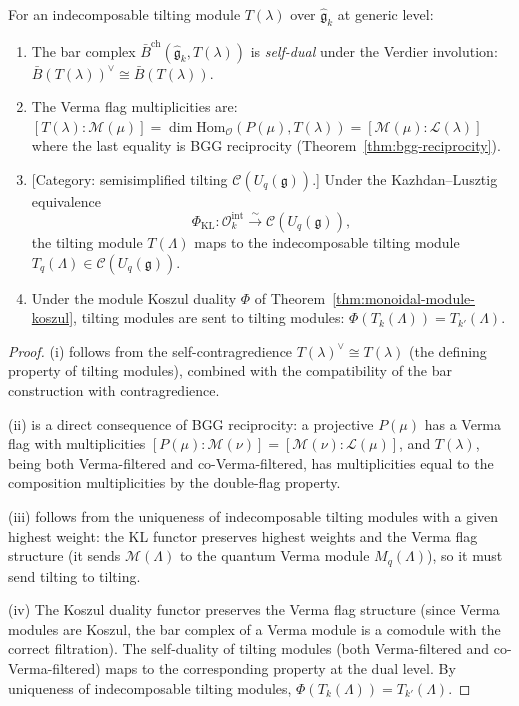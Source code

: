 \begin{proposition}
\label{prop:tilting-bar}
For an indecomposable tilting module $T(\lambda)$ over
$\widehat{\mathfrak{g}}_k$ at generic level:
\begin{enumerate}[label=\textup{(\roman*)}]
\item The bar complex $\bar{B}^{\mathrm{ch}}(\widehat{\mathfrak{g}}_k,
  T(\lambda))$ is \emph{self-dual} under the Verdier involution:
  $\bar{B}(T(\lambda))^\vee \cong \bar{B}(T(\lambda))$.
\item The Verma flag multiplicities are:
  $[T(\lambda) : \mathcal{M}(\mu)]
  = \dim \mathrm{Hom}_{\mathcal{O}}(P(\mu), T(\lambda))
  = [\mathcal{M}(\mu) : \mathcal{L}(\lambda)]$
  where the last equality is BGG reciprocity
  \textup{(}Theorem~\textup{\ref{thm:bgg-reciprocity})}.
\item \textup{[Category: semisimplified tilting
  $\mathcal{C}(U_q(\mathfrak{g}))$.]}
  Under the Kazhdan--Lusztig equivalence
  \[
  \Phi_{\mathrm{KL}}\colon
  \mathcal{O}_k^{\mathrm{int}} \xrightarrow{\sim}
  \mathcal{C}(U_q(\mathfrak{g})),
  \]
  the tilting module $T(\Lambda)$ maps to the indecomposable
  tilting module
  $T_q(\Lambda) \in \mathcal{C}(U_q(\mathfrak{g}))$.
\item Under the module Koszul duality $\Phi$ of
  Theorem~\textup{\ref{thm:monoidal-module-koszul}},
  tilting modules are sent to tilting modules:
  $\Phi(T_k(\Lambda)) = T_{k'}(\Lambda)$.
\end{enumerate}
\end{proposition}

\begin{proof}
(i) follows from the self-contragredience
$T(\lambda)^\vee \cong T(\lambda)$ (the defining property of tilting
modules), combined with the compatibility of the bar construction
with contragredience.

(ii) is a direct consequence of BGG reciprocity: a projective
$P(\mu)$ has a Verma flag with multiplicities
$[P(\mu) : \mathcal{M}(\nu)] = [\mathcal{M}(\nu) : \mathcal{L}(\mu)]$,
and $T(\lambda)$, being both Verma-filtered and co-Verma-filtered, has
multiplicities equal to the composition multiplicities by the
double-flag property.

(iii) follows from the uniqueness of indecomposable tilting modules
with a given highest weight: the KL functor preserves highest
weights and the Verma flag structure (it sends
$\mathcal{M}(\Lambda)$ to the quantum Verma module
$M_q(\Lambda)$), so it must send tilting to tilting.

(iv) The Koszul duality functor preserves the Verma flag structure
(since Verma modules are Koszul, the bar complex of a Verma module is
a comodule with the correct filtration).  The self-duality of tilting
modules (both Verma-filtered and co-Verma-filtered) maps to the
corresponding property at the dual level.  By uniqueness of
indecomposable tilting modules, $\Phi(T_k(\Lambda)) = T_{k'}(\Lambda)$.
\end{proof}

